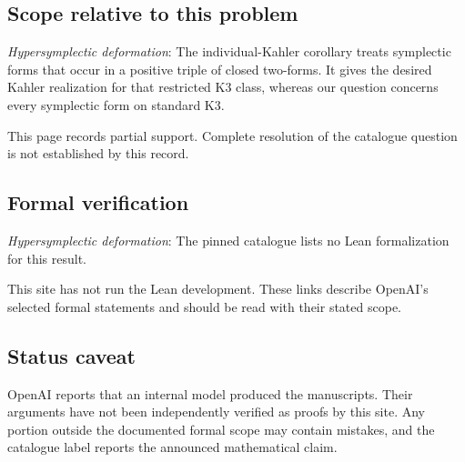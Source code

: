 \documentclass[11pt]{article}
\begin{document}
\subsection{Scope relative to this problem}
\textit{Hypersymplectic deformation}: The individual-Kahler corollary treats symplectic forms that occur in a positive triple of closed two-forms. It gives the desired Kahler realization for that restricted K3 class, whereas our question concerns every symplectic form on standard K3.

This page records partial support. Complete resolution of the catalogue question is not established by this record.

\subsection{Formal verification}
\textit{Hypersymplectic deformation}: The pinned catalogue lists no Lean formalization for this result.

This site has not run the Lean development. These links describe OpenAI’s selected formal statements and should be read with their stated scope.

\subsection{Status caveat}
OpenAI reports that an internal model produced the manuscripts. Their arguments have not been independently verified as proofs by this site. Any portion outside the documented formal scope may contain mistakes, and the catalogue label reports the announced mathematical claim.
\end{document}
